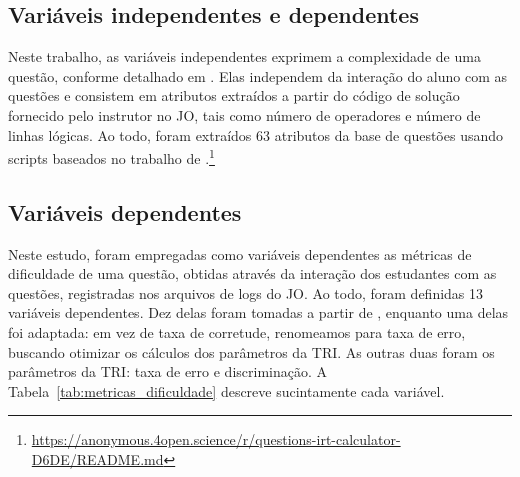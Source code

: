\documentclass[12pt]{article}
\begin{document}
\subsection{Variáveis independentes e dependentes}

Neste trabalho, as variáveis independentes exprimem a complexidade de uma questão, conforme detalhado em \cite{elrik2022}. Elas independem da interação do aluno com as questões e consistem em atributos extraídos a partir do código de solução fornecido pelo instrutor no JO, tais como número de operadores e número de linhas lógicas. Ao todo, foram extraídos 63 atributos da base de questões usando scripts baseados no trabalho de \cite{marcos2021}.\footnote{\url{https://anonymous.4open.science/r/questions-irt-calculator-D6DE/README.md}}

\subsection{Variáveis dependentes}

Neste estudo, foram empregadas como variáveis dependentes as métricas de dificuldade de uma questão, obtidas através da interação dos estudantes com as questões, registradas nos arquivos de logs do JO. Ao todo, foram definidas 13 variáveis dependentes. Dez delas foram tomadas a partir de \cite{jackson2023}, enquanto uma delas foi adaptada: em vez de taxa de corretude, renomeamos para taxa de erro, buscando otimizar os cálculos dos parâmetros da TRI. As outras duas foram os parâmetros da TRI: taxa de erro e discriminação. A Tabela~\ref{tab:metricas_dificuldade} descreve sucintamente cada variável.
\end{document}
